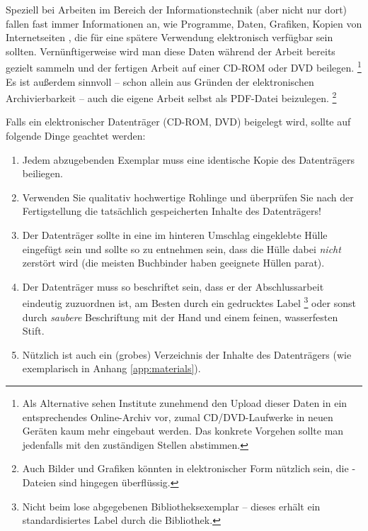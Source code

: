 Speziell bei Arbeiten im Bereich der Informationstechnik (aber nicht nur
dort) fallen fast immer Informationen an, wie Programme, Daten, Grafiken,
Kopien von Internetseiten \usw, die für eine spätere Verwendung elektronisch
verfügbar sein sollten. Vernünftigerweise wird man diese Daten während der
Arbeit bereits gezielt sammeln und der fertigen Arbeit auf einer CD-ROM oder
DVD beilegen.%
\footnote{Als Alternative sehen Institute zunehmend den Upload dieser Daten
in ein entsprechendes Online-Archiv vor, zumal CD/DVD-Laufwerke in neuen
Geräten kaum mehr eingebaut werden. Das konkrete Vorgehen sollte man
jedenfalls mit den zuständigen Stellen abstimmen.}
Es ist außerdem sinnvoll -- schon allein aus Gründen der elektronischen
Archivierbarkeit -- auch die eigene Arbeit selbst als PDF-Datei beizulegen.%
\footnote{Auch Bilder und Grafiken könnten in elektronischer Form nützlich
sein, die \latex-Dateien sind hingegen überflüssig.}

Falls ein elektronischer Datenträger (CD-ROM, DVD) beigelegt wird, sollte auf
folgende Dinge geachtet werden:
%
\begin{enumerate}
	\item Jedem abzugebenden Exemplar muss eine identische Kopie des
	Datenträgers beiliegen.
	\item Verwenden Sie qualitativ hochwertige Rohlinge und überprüfen
	Sie nach der Fertigstellung die tatsächlich gespeicherten Inhalte
	des Datenträgers!
	\item Der Datenträger sollte in eine im hinteren Umschlag eingeklebte
	Hülle eingefügt sein und sollte so zu entnehmen sein, dass die Hülle
	dabei \emph{nicht} zerstört wird (die meisten Buchbinder haben geeignete
	Hüllen parat).
	\item Der Datenträger muss so beschriftet sein, dass er der
	Abschlussarbeit eindeutig zuzuordnen ist, am Besten durch ein
	gedrucktes Label%
	\footnote{Nicht beim lose abgegebenen Bibliotheksexemplar --
	dieses erhält ein standardisiertes Label durch die Bibliothek.}
	oder sonst durch \emph{saubere}	Beschriftung mit der Hand und einem
	feinen, wasserfesten Stift.
	\item Nützlich ist auch ein (grobes) Verzeichnis der Inhalte des
	Datenträgers (wie exemplarisch in Anhang \ref{app:materials}).
\end{enumerate}
